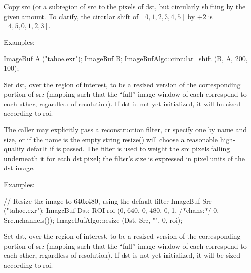  

Copy {\cf src} (or a subregion of {\cf src} to the pixels of {\cf dst},
but circularly shifting by the given amount.  To clarify, the circular
shift of $[0,1,2,3,4,5]$ by $+2$ is $[4,5,0,1,2,3]$.

\smallskip
\noindent Examples:
\begin{code}
    ImageBuf A ("tahoe.exr");
    ImageBuf B;
    ImageBufAlgo::circular_shift (B, A, 200, 100);
\end{code}
\apiend


 
Set {\cf dst}, over the region of interest, to be a resized version of the
corresponding portion of {\cf src} (mapping such that the ``full'' image
window of each correspond to each other, regardless of resolution).  If
{\cf dst} is not yet initialized, it will be sized according to {\cf roi}.

The caller may explicitly pass a reconstruction filter, or specify one by
name and size, or if the name is the empty string {\cf resize()} will choose
a reasonable high-quality default if \NULL is passed.  The filter is used to
weight the {\cf src} pixels falling underneath it for each {\cf dst} pixel;
the filter's size is expressed in pixel units of the dst image.

\smallskip
\noindent Examples:
\begin{code}
    // Resize the image to 640x480, using the default filter
    ImageBuf Src ("tahoe.exr");
    ImageBuf Dst;
    ROI roi (0, 640, 0, 480, 0, 1, /*chans:*/ 0, Src.nchannels());
    ImageBufAlgo::resize (Dst, Src, "", 0, roi);
\end{code}
\apiend


 
Set {\cf dst}, over the region of interest, to be a resized version of the
corresponding portion of {\cf src} (mapping such that the ``full'' image
window of each correspond to each other, regardless of resolution).  If
{\cf dst} is not yet initialized, it will be sized according to {\cf roi}.

